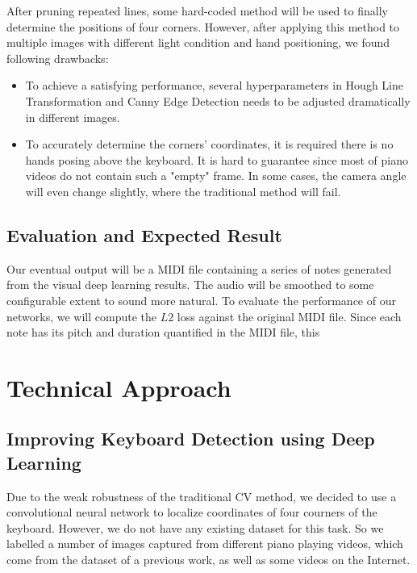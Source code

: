 \documentclass[10pt,twocolumn,letterpaper]{article}
\begin{document}
After pruning repeated lines, some hard-coded method will be used to finally determine the positions of four corners. However, after applying this method to multiple images with different light condition and hand positioning, we found following drawbacks:

\begin{itemize}
  \item To achieve a satisfying performance, several hyperparameters in Hough Line Transformation and Canny Edge Detection needs to be adjusted dramatically in different images.
  \item To accurately determine the corners' coordinates, it is required there is no hands posing above the keyboard. It is hard to guarantee since most of piano videos do not contain such a "empty" frame. In some cases, the camera angle will even change slightly, where the traditional method will fail.
\end{itemize}

\subsection{Evaluation and Expected Result}

Our eventual output will be a MIDI file containing a series of notes generated from the visual deep learning results. The audio will be smoothed to some configurable extent to sound more natural. To evaluate the performance of our networks, we will compute the $L2$ loss against the original MIDI file. Since each note has its pitch and duration quantified in the MIDI file, this 

\section{Technical Approach}

\subsection{Improving Keyboard Detection using Deep Learning}

Due to the weak robustness of the traditional CV method, we decided to use a convolutional neural network to localize coordinates of four courners of the keyboard. However, we do not have any existing dataset for this task. So we labelled a number of images captured from different piano playing videos, which come from the dataset of a previous work, as well as some videos on the Internet.
\end{document}

